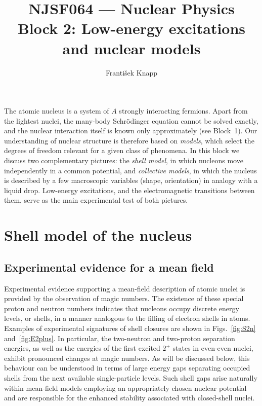 \documentclass[11pt,a4paper]{article}
\title{NJSF064 --- Nuclear Physics\\[2mm]\large Block 2: Low-energy excitations and nuclear models}
\author{František Knapp}
\date{}
\begin{document}
\maketitle


The atomic nucleus is a system of $A$ strongly interacting fermions. Apart from the lightest nuclei, the many-body Schr\"odinger equation cannot be solved exactly, and the nuclear interaction itself is known only approximately (see Block~1). Our understanding of nuclear structure is therefore based on \emph{models}, which select the degrees of freedom relevant for a given class of phenomena. In this block we discuss two complementary pictures: the \emph{shell model}, in which nucleons move independently in a common potential, and \emph{collective models}, in which the nucleus is described by a few macroscopic variables (shape, orientation) in analogy with a liquid drop. Low-energy excitations, and the electromagnetic transitions between them, serve as the main experimental test of both pictures.


\section{Shell model of the nucleus}


\subsection{Experimental evidence for a mean field}

Experimental evidence supporting a mean-field description of atomic nuclei is provided by the observation of magic numbers. The existence of these special proton and neutron numbers indicates that nucleons occupy discrete energy levels, or shells, in a manner analogous to the filling of electron shells in atoms. Examples of experimental signatures of shell closures are shown in Figs.~\ref{fig:S2n} and~\ref{fig:E2plus}. In particular, the two-neutron and two-proton separation energies, as well as the energies of the first excited $2^+$ states in even-even nuclei, exhibit pronounced changes at magic numbers. As will be discussed below, this behaviour can be understood in terms of large energy gaps separating occupied shells from the next available single-particle levels. Such shell gaps arise naturally within mean-field models employing an appropriately chosen nuclear potential and are responsible for the enhanced stability associated with closed-shell nuclei.
\end{document}
